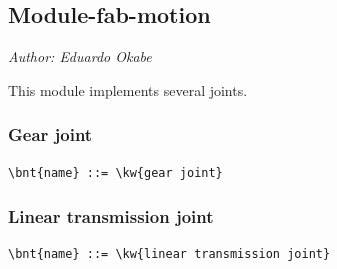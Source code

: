 






\subsection{Module-fab-motion}
\emph{Author: Eduardo Okabe}

\noindent
This module implements several joints.

\subsubsection{Gear joint}
\begin{Verbatim}[commandchars=\\\{\}]
    \bnt{name} ::= \kw{gear joint}
\end{Verbatim}

\subsubsection{Linear transmission joint}
\begin{Verbatim}[commandchars=\\\{\}]
    \bnt{name} ::= \kw{linear transmission joint}
\end{Verbatim}

